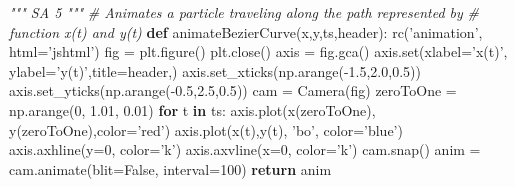\documentclass[11pt]{article}
\newenvironment{Shaded}{}{}
\newcommand{\KeywordTok}[1]{\textcolor[rgb]{0.00,0.44,0.13}{\textbf{{#1}}}}
\newcommand{\DecValTok}[1]{\textcolor[rgb]{0.25,0.63,0.44}{{#1}}}
\newcommand{\FloatTok}[1]{\textcolor[rgb]{0.25,0.63,0.44}{{#1}}}
\newcommand{\StringTok}[1]{\textcolor[rgb]{0.25,0.44,0.63}{{#1}}}
\newcommand{\CommentTok}[1]{\textcolor[rgb]{0.38,0.63,0.69}{\textit{{#1}}}}
\newcommand{\NormalTok}[1]{{#1}}
\newcommand{\VariableTok}[1]{\textcolor[rgb]{0.10,0.09,0.49}{{#1}}}
\newcommand{\ControlFlowTok}[1]{\textcolor[rgb]{0.00,0.44,0.13}{\textbf{{#1}}}}
\newcommand{\OperatorTok}[1]{\textcolor[rgb]{0.40,0.40,0.40}{{#1}}}
\newcommand{\BuiltInTok}[1]{{#1}}
\begin{document}
\begin{Shaded}
\begin{Highlighting}[]
\CommentTok{""" SA 5 """}
\CommentTok{# Animates a particle traveling along the path represented by}
\CommentTok{# function x(t) and y(t)}
\KeywordTok{def}\NormalTok{ animateBezierCurve(x,y,ts,header):}
\NormalTok{    rc(}\StringTok{'animation'}\NormalTok{, html}\OperatorTok{=}\StringTok{'jshtml'}\NormalTok{)}
\NormalTok{    fig }\OperatorTok{=}\NormalTok{ plt.figure()}
\NormalTok{    plt.close()}
\NormalTok{    axis }\OperatorTok{=}\NormalTok{ fig.gca()}
\NormalTok{    axis.}\BuiltInTok{set}\NormalTok{(xlabel}\OperatorTok{=}\StringTok{'x(t)'}\NormalTok{, ylabel}\OperatorTok{=}\StringTok{'y(t)'}\NormalTok{,title}\OperatorTok{=}\NormalTok{header,)}
\NormalTok{    axis.set_xticks(np.arange(}\OperatorTok{-}\FloatTok{1.5}\NormalTok{,}\FloatTok{2.0}\NormalTok{,}\FloatTok{0.5}\NormalTok{))}
\NormalTok{    axis.set_yticks(np.arange(}\OperatorTok{-}\FloatTok{0.5}\NormalTok{,}\FloatTok{2.5}\NormalTok{,}\FloatTok{0.5}\NormalTok{))}
\NormalTok{    cam }\OperatorTok{=}\NormalTok{ Camera(fig)}
\NormalTok{    zeroToOne }\OperatorTok{=}\NormalTok{ np.arange(}\DecValTok{0}\NormalTok{, }\FloatTok{1.01}\NormalTok{, }\FloatTok{0.01}\NormalTok{)}
    \ControlFlowTok{for}\NormalTok{ t }\KeywordTok{in}\NormalTok{ ts:}
\NormalTok{        axis.plot(x(zeroToOne), y(zeroToOne),color}\OperatorTok{=}\StringTok{'red'}\NormalTok{)}
\NormalTok{        axis.plot(x(t),y(t), }\StringTok{'bo'}\NormalTok{, color}\OperatorTok{=}\StringTok{'blue'}\NormalTok{)}
\NormalTok{        axis.axhline(y}\OperatorTok{=}\DecValTok{0}\NormalTok{, color}\OperatorTok{=}\StringTok{'k'}\NormalTok{)}
\NormalTok{        axis.axvline(x}\OperatorTok{=}\DecValTok{0}\NormalTok{, color}\OperatorTok{=}\StringTok{'k'}\NormalTok{)}
\NormalTok{        cam.snap()}
\NormalTok{    anim }\OperatorTok{=}\NormalTok{ cam.animate(blit}\OperatorTok{=}\VariableTok{False}\NormalTok{, interval}\OperatorTok{=}\DecValTok{100}\NormalTok{)}
    \ControlFlowTok{return}\NormalTok{ anim}





\end{Highlighting}
\end{Shaded}
\end{document}
